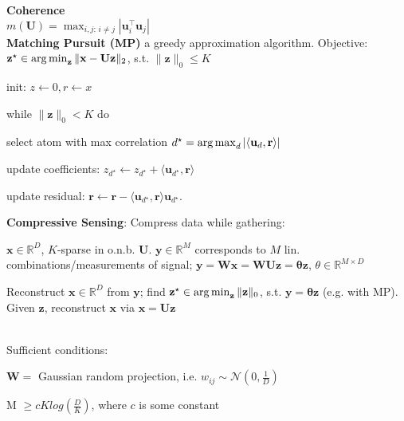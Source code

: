 \textbf{Coherence} \\
$m(\mathbf{U}) = \max_{i,j:\, i \neq j} | \mathbf{u}_i^\top \mathbf{u}_j |$ \\
\textbf{Matching Pursuit (MP)}
a greedy approximation algorithm.
Objective: $\mathbf{z}^\star \in \operatorname*{arg\,min}_{\mathbf{z}} \|\mathbf{x} - \mathbf{Uz} \|_2$, s.t. $\|\mathbf{z}\|_0 \leq K$
\begin{inparaenum}
	\item init: $z \leftarrow 0, r \leftarrow x$
	\item while $\|\mathbf{z}\|_0 < K$ do
	\item select atom with max correlation $d^\star = \operatorname*{arg\,max}_d |\langle \mathbf{u}_d, \mathbf{r} \rangle|$
	\item update coefficients: $z_{d^\star} \leftarrow z_{d^\star} + \langle \mathbf{u}_{d^\star}, \mathbf{r} \rangle$
	\item update residual: $\mathbf{r} \leftarrow \mathbf{r} - \langle \mathbf{u}_{d^\star}, \mathbf{r} \rangle \mathbf{u}_{d^\star}$.
\end{inparaenum}

\textbf{Compressive Sensing}: Compress data while gathering:
\begin{inparaitem}[\color{red}\textbullet]
  \item $\mathbf{x} \in \mathbb{R}^D$, $K$-sparse in o.n.b. $\mathbf{U}$. $\mathbf{y} \in \mathbb{R}^M$ corresponds to $M$ lin. combinations/measurements of signal; $\mathbf{y} = \mathbf{Wx} = \mathbf{WUz} = \mathbf{\theta z}$, $\theta \in \mathbb{R}^{M \times D}$
  \item Reconstruct $\mathbf{x} \in \mathbb{R}^D$ from $\mathbf{y}$; find $\mathbf{z}^\star \in \operatorname*{arg\,min}_{\mathbf{z}}\|\mathbf{z}\|_0$, s.t. $\mathbf{y} = \mathbf{\theta z}$ (e.g. with MP). Given $\mathbf{z}$, reconstruct $\mathbf{x}$ via $\mathbf{x} = \mathbf{Uz}$
\end{inparaitem}
\\Sufficient conditions:
\begin{inparaitem}[\color{red}\textbullet]
  \item $\mathbf{W} = $ Gaussian random projection, i.e. $w_{ij}\sim\mathcal{N}(0, \frac{1}{D})$
  \item M $\geq cK log(\frac{D}{K})$, where $c$ is some constant
\end{inparaitem}

